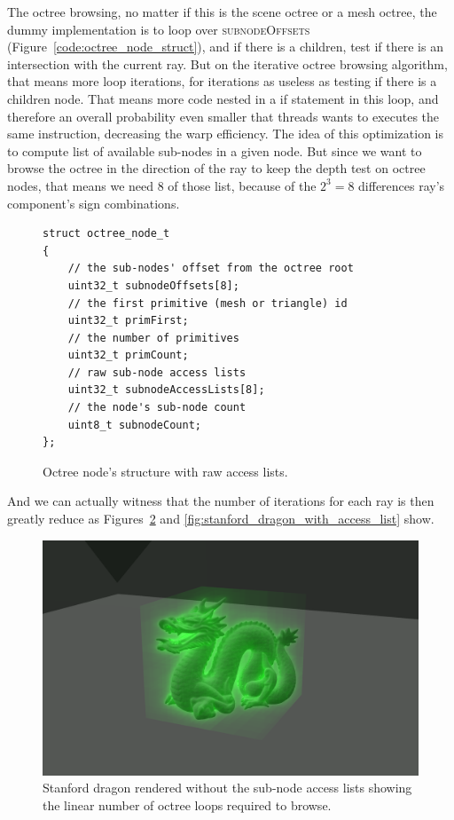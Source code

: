 The octree browsing, no matter if this is the scene octree or a mesh octree,
the dummy implementation is to loop over \textsc{subnodeOffsets}
(Figure~\ref{code:octree_node_struct}), and if there is a children, test if
there is an intersection with the current ray. But on the iterative octree
browsing algorithm, that means more loop iterations, for iterations as useless
as testing if there is a children node. That means more code nested in a if
statement in this loop, and therefore an overall probability even smaller that
threads wants to executes the same instruction, decreasing the warp efficiency.
The idea of this optimization is to compute list of available sub-nodes in
a given node. But since we want to browse the octree in the direction of the
ray to keep the depth test on octree nodes, that means we need 8 of those list,
because of the $2^3 = 8$ differences ray's component's sign combinations.

\begin{figure}[H]
    \centering
    \begin{lstlisting}[morekeywords={uint8_t,uint32_t}]
struct octree_node_t
{
    // the sub-nodes' offset from the octree root
    uint32_t subnodeOffsets[8];
    // the first primitive (mesh or triangle) id
    uint32_t primFirst;
    // the number of primitives
    uint32_t primCount;
    // raw sub-node access lists
    uint32_t subnodeAccessLists[8];
    // the node's sub-node count
    uint8_t subnodeCount;
};
    \end{lstlisting}
    \caption{Octree node's structure with raw access lists.}
    \label{code:raw_access_list}
\end{figure}

And we can actually witness that the number of iterations for each ray is
then greatly reduce as Figures~\ref{fig:stanford_dragon_without_access_list} and
\ref{fig:stanford_dragon_with_access_list} show.

\begin{figure}[h]
    \centering
    \includegraphics[width=0.8\columnwidth]{stats_octree_loops.png}
    \caption{
        Stanford dragon rendered without the sub-node access lists showing
        the linear number of octree loops required to browse.
    }
    \label{fig:stanford_dragon_without_access_list}
\end{figure}

